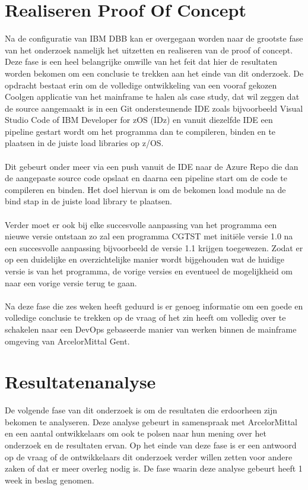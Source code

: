 \section{Realiseren Proof Of Concept}
\label{sec:poc}
Na de configuratie van IBM DBB kan er overgegaan worden naar de grootste fase van het onderzoek namelijk het uitzetten en realiseren van de proof of concept.
Deze fase is een heel belangrijke omwille van het feit dat hier de resultaten worden bekomen om een conclusie te trekken aan het einde van dit onderzoek.
De opdracht bestaat erin om de volledige ontwikkeling van een vooraf gekozen Coolgen applicatie van het mainframe te halen als case study, dat wil zeggen dat de source aangemaakt is in een Git ondersteunende IDE zoals bijvoorbeeld Visual Studio Code of IBM Developer for zOS (IDz) en vanuit diezelfde IDE een pipeline gestart wordt om het programma dan te compileren, binden en te plaatsen in de juiste load libraries op z/OS.
\\ \\
Dit gebeurt onder meer via een push vanuit de IDE naar de Azure Repo die dan de aangepaste source code opslaat en daarna een pipeline start om de code te compileren en binden. Het doel hiervan is om de bekomen load module na de bind stap in de juiste load library te plaatsen.
\\ \\
Verder moet er ook bij elke succesvolle aanpassing van het programma een nieuwe versie ontstaan zo zal een programma CGTST met initiële versie 1.0 na een succesvolle
aanpassing bijvoorbeeld de versie 1.1 krijgen toegewezen.
Zodat er op een duidelijke en overzichtelijke manier wordt bijgehouden wat de huidige versie is van het programma, de vorige versies en eventueel de mogelijkheid om naar een vorige versie terug te gaan.
\\ \\
Na deze fase die zes weken heeft geduurd is er genoeg informatie om een goede en volledige conclusie te trekken op de vraag of het zin heeft om volledig over te schakelen naar een DevOps gebaseerde manier van werken binnen de mainframe omgeving van ArcelorMittal Gent.

\section{Resultatenanalyse}
\label{sec:resulatatenanalyse}
De volgende fase van dit onderzoek is om de resultaten die erdoorheen zijn bekomen te analyseren. Deze analyse gebeurt in samenspraak met ArcelorMittal en een aantal ontwikkelaars om ook te polsen naar hun mening over het onderzoek en de resultaten ervan.
Op het einde van deze fase is er een antwoord op de vraag of de ontwikkelaars dit onderzoek verder willen zetten voor andere zaken of dat er meer overleg nodig is. 
De fase waarin deze analyse gebeurt heeft 1 week in beslag genomen.

